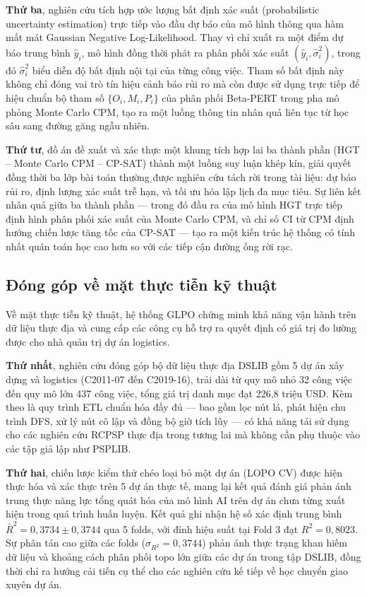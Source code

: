 \textbf{Thứ ba}, nghiên cứu tích hợp ước lượng bất định xác suất (probabilistic uncertainty estimation) trực tiếp vào đầu dự báo của mô hình thông qua hàm mất mát Gaussian Negative Log-Likelihood. Thay vì chỉ xuất ra một điểm dự báo trung bình $\hat{y}_i$, mô hình đồng thời phát ra phân phối xác suất $(\hat{y}_i, \hat{\sigma}_i^2)$, trong đó $\hat{\sigma}_i^2$ biểu diễn độ bất định nội tại của từng công việc. Tham số bất định này không chỉ đóng vai trò tín hiệu cảnh báo rủi ro mà còn được sử dụng trực tiếp để hiệu chuẩn bộ tham số $\{O_i, M_i, P_i\}$ của phân phối Beta-PERT trong pha mô phỏng Monte Carlo CPM, tạo ra một luồng thông tin nhân quả liên tục từ học sâu sang đường găng ngẫu nhiên.

\textbf{Thứ tư}, đồ án đề xuất và xác thực một khung tích hợp lai ba thành phần (HGT -- Monte Carlo CPM -- CP-SAT) thành một luồng suy luận khép kín, giải quyết đồng thời ba lớp bài toán thường được nghiên cứu tách rời trong tài liệu: dự báo rủi ro, định lượng xác suất trễ hạn, và tối ưu hóa lập lịch đa mục tiêu. Sự liên kết nhân quả giữa ba thành phần — trong đó đầu ra của mô hình HGT trực tiếp định hình phân phối xác suất của Monte Carlo CPM, và chỉ số CI từ CPM định hướng chiến lược tăng tốc của CP-SAT — tạo ra một kiến trúc hệ thống có tính nhất quán toán học cao hơn so với các tiếp cận đường ống rời rạc.

\subsection{Đóng góp về mặt thực tiễn kỹ thuật}
\label{sec:4.1.2_dong_gop_thuc_tien}

Về mặt thực tiễn kỹ thuật, hệ thống GLPO chứng minh khả năng vận hành trên dữ liệu thực địa và cung cấp các công cụ hỗ trợ ra quyết định có giá trị đo lường được cho nhà quản trị dự án logistics.

\textbf{Thứ nhất}, nghiên cứu đóng góp bộ dữ liệu thực địa DSLIB gồm 5 dự án xây dựng và logistics (C2011-07 đến C2019-16), trải dài từ quy mô nhỏ 32 công việc đến quy mô lớn 437 công việc, tổng giá trị danh mục đạt 226,8 triệu USD. Kèm theo là quy trình ETL chuẩn hóa đầy đủ — bao gồm lọc nút lá, phát hiện chu trình DFS, xử lý nút cô lập và đồng bộ giờ tích lũy — có khả năng tái sử dụng cho các nghiên cứu RCPSP thực địa trong tương lai mà không cần phụ thuộc vào các tập giả lập như PSPLIB.

\textbf{Thứ hai}, chiến lược kiểm thử chéo loại bỏ một dự án (LOPO CV) được hiện thực hóa và xác thực trên 5 dự án thực tế, mang lại kết quả đánh giá phản ánh trung thực năng lực tổng quát hóa của mô hình AI trên dự án chưa từng xuất hiện trong quá trình huấn luyện. Kết quả ghi nhận hệ số xác định trung bình $\bar{R}^2 = 0{,}3734 \pm 0{,}3744$ qua 5 folds, với đỉnh hiệu suất tại Fold 3 đạt $R^2 = 0{,}8023$. Sự phân tán cao giữa các folds ($\sigma_{R^2} = 0{,}3744$) phản ánh thực trạng khan hiếm dữ liệu và khoảng cách phân phối topo lớn giữa các dự án trong tập DSLIB, đồng thời chỉ ra hướng cải tiến cụ thể cho các nghiên cứu kế tiếp về học chuyển giao xuyên dự án.

